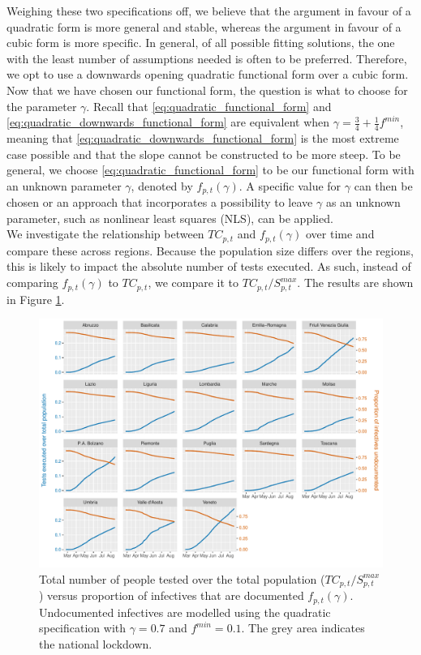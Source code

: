 \documentclass[12pt]{article}
\begin{document}
    Weighing these two specifications off, we believe that the argument in favour of a quadratic form is more general and stable, whereas the argument in favour of a cubic form is more specific. In general, of all possible fitting solutions, the one with the least number of assumptions needed is often to be preferred. Therefore, we opt to use a downwards opening quadratic functional form over a cubic form. Now that we have chosen our functional form, the question is what to choose for the parameter $\gamma$. Recall that \eqref{eq:quadratic_functional_form} and \eqref{eq:quadratic_downwards_functional_form} are equivalent when $\gamma = \frac{3}{4} + \frac{1}{4}f^{min}$, meaning that \eqref{eq:quadratic_downwards_functional_form} is the most extreme case possible and that the slope cannot be constructed to be more steep. To be general, we choose \eqref{eq:quadratic_functional_form} to be our functional form with an unknown parameter $\gamma$, denoted by $f_{p,t}(\gamma)$. A specific value for $\gamma$ can then be chosen or an approach that incorporates a possibility to leave $\gamma$ as an unknown parameter, such as nonlinear least squares (NLS), can be applied. \\
	
	We investigate the relationship between $TC_{p,t}$ and $f_{p,t}(\gamma)$ over time and compare these across regions. Because the population size differs over the regions, this is likely to impact the absolute number of tests executed. As such, instead of comparing $f_{p,t}(\gamma)$ to $TC_{p,t}$, we compare it to $TC_{p,t} / S^{max}_{p,t}$. The results are shown in Figure \ref{fig:tamponiprop_versus_ft}. 
	
	\begin{figure}[H]
	    \centering
	    \includegraphics[width=\textwidth]{output/tamponiprop_vs_ft.pdf}
	    \caption{Total number of people tested over the total population ($TC_{p,t} / S^{max}_{p,t}$) versus proportion of infectives that are documented $f_{p,t}(\gamma)$. Undocumented infectives are modelled using the quadratic specification with $\gamma = 0.7$ and $f^{min}=0.1$. The grey area indicates the national lockdown.}
	    \label{fig:tamponiprop_versus_ft}
	\end{figure}
	
\end{document}
